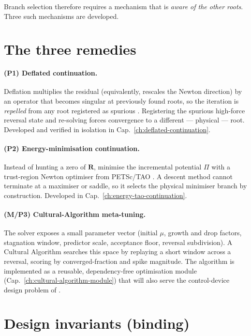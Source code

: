 Branch selection therefore requires a mechanism that is \emph{aware of
the other roots}. Three such mechanisms are developed.

\section{The three remedies}

\paragraph{(P1) Deflated continuation.}
Deflation multiplies the residual (equivalently, rescales the Newton
direction) by an operator that becomes singular at previously found
roots, so the iteration is \emph{repelled} from any root registered as
spurious \cite{FarrellBirkissonFunke2015}. Registering the spurious
high-force reversal state and re-solving forces convergence to a
different --- physical --- root. Developed and verified in isolation in
Cap.~\ref{ch:deflated-continuation}.

\paragraph{(P2) Energy-minimisation continuation.}
Instead of hunting a zero of \(\mathbf{R}\), minimise the incremental
potential \(\Pi\) with a trust-region Newton optimiser
\cite{NocedalWright2006,ConnGouldToint2000} from PETSc/TAO
\cite{BalayPETScManual}. A descent method cannot terminate at a maximiser
or saddle, so it selects the physical minimiser branch by construction.
Developed in Cap.~\ref{ch:energy-tao-continuation}.

\paragraph{(M/P3) Cultural-Algorithm meta-tuning.}
The solver exposes a small parameter vector (initial \(\mu\), growth and
drop factors, stagnation window, predictor scale, acceptance floor,
reversal subdivision). A Cultural Algorithm \cite{Reynolds1994Cultural,
ReynoldsPeng2004} searches this space by replaying a short window across
a reversal, scoring by converged-fraction and spike magnitude. The
algorithm is implemented as a reusable, dependency-free optimisation
module (Cap.~\ref{ch:cultural-algorithm-module}) that will also serve the
control-device design problem of
\cite{LaraValenciaEchavarriaValencia2024}.

\section{Design invariants (binding)}

